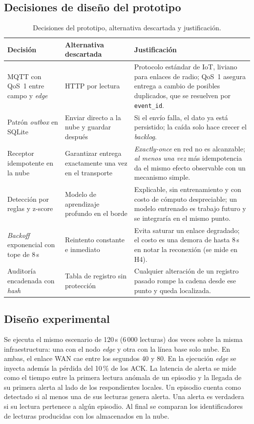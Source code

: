 \subsection{Decisiones de diseño del prototipo}

\begin{table}[htbp]
\centering
\caption{Decisiones del prototipo, alternativa descartada y justificación.}
\label{tab:adr-prototipo}
\small
\begin{tabularx}{\textwidth}{@{}p{3.6cm}LL@{}}
\toprule
\textbf{Decisión} & \textbf{Alternativa descartada} & \textbf{Justificación} \\
\midrule
MQTT con QoS~1 entre campo y \emph{edge} & HTTP por lectura & Protocolo
estándar de IoT, liviano para enlaces de radio; QoS~1 asegura entrega a cambio
de posibles duplicados, que se resuelven por \texttt{event\_id}. \\
\addlinespace
Patrón \emph{outbox} en SQLite & Enviar directo a la nube y guardar después &
Si el envío falla, el dato ya está persistido; la caída solo hace crecer el
\emph{backlog}. \\
\addlinespace
Receptor idempotente en la nube & Garantizar entrega exactamente una vez en el
transporte & \emph{Exactly-once} en red no es alcanzable; \emph{al menos una
vez} más idempotencia da el mismo efecto observable con un mecanismo simple. \\
\addlinespace
Detección por reglas y z-score & Modelo de aprendizaje profundo en el borde &
Explicable, sin entrenamiento y con costo de cómputo despreciable; un modelo
entrenado es trabajo futuro y se integraría en el mismo punto. \\
\addlinespace
\emph{Backoff} exponencial con tope de 8\,s & Reintento constante e inmediato &
Evita saturar un enlace degradado; el costo es una demora de hasta 8\,s en
notar la reconexión (se mide en H4). \\
\addlinespace
Auditoría encadenada con \emph{hash} & Tabla de registro sin protección &
Cualquier alteración de un registro pasado rompe la cadena desde ese punto y
queda localizada. \\
\bottomrule
\end{tabularx}
\end{table}

\subsection{Diseño experimental}

Se ejecuta el mismo escenario de 120\,s (6\,000 lecturas) dos veces sobre la
misma infraestructura: una con el nodo \emph{edge} y otra con la línea base
solo nube. En ambas, el enlace WAN cae entre los segundos 40 y 80. En la
ejecución \emph{edge} se inyecta además la pérdida del 10\,\% de los ACK. La
latencia de alerta se mide como el tiempo entre la primera lectura anómala de
un episodio y la llegada de su primera alerta al lado de los respondientes
locales. Un episodio cuenta como detectado si al menos una de sus lecturas
genera alerta. Una alerta es verdadera si su lectura pertenece a algún
episodio. Al final se comparan los identificadores de lecturas producidas con
los almacenados en la nube.

